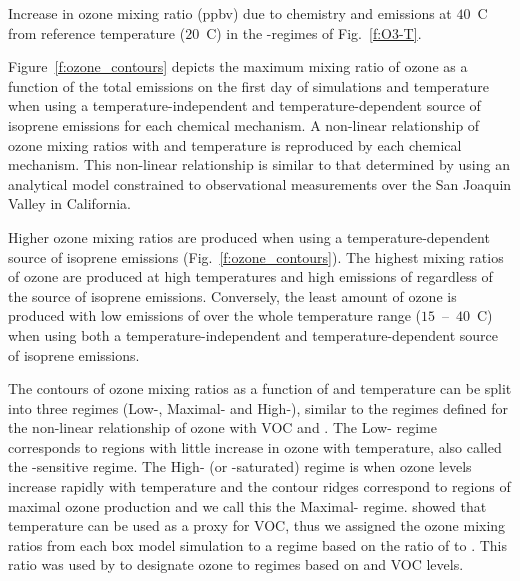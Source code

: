 \begin{table}%
    \centering%
    \caption{Increase in ozone mixing ratio (ppbv) due to chemistry and emissions at $40$~\degree C from reference temperature ($20$~\degree C) in the -regimes of Fig.~\ref{f:O3-T}.}%
    \label{t:differences}%
\end{table}

Figure~\ref{f:ozone_contours} depicts the maximum mixing ratio of ozone as a function of the total  emissions on the first day of simulations and temperature when using a temperature-independent and temperature-dependent source of isoprene emissions for each chemical mechanism.
A non-linear relationship of ozone mixing ratios with  and temperature is reproduced by each chemical mechanism.
This non-linear relationship is similar to that determined by \citet{Pusede:2014} using an analytical model constrained to observational measurements over the San Joaquin Valley in California.

Higher ozone mixing ratios are produced when using a temperature-dependent source of isoprene emissions (Fig.~\ref{f:ozone_contours}).
The highest mixing ratios of ozone are produced at high temperatures and high emissions of  regardless of the source of isoprene emissions.
Conversely, the least amount of ozone is produced with low emissions of  over the whole temperature range ($15$~--~$40$~\degree C) when using both a temperature-independent and temperature-dependent source of isoprene emissions.

The contours of ozone mixing ratios as a function of  and temperature can be split into three  regimes (Low-, Maximal- and High-), similar to the  regimes defined for the non-linear relationship of ozone with VOC and .
The Low- regime corresponds to regions with little increase in ozone with temperature, also called the -sensitive regime.
The High- (or -saturated) regime is when ozone levels increase rapidly with temperature and the contour ridges correspond to regions of maximal ozone production and we call this the Maximal- regime.
\citet{Pusede:2014} showed that temperature can be used as a proxy for VOC, thus we assigned the ozone mixing ratios from each box model simulation to a  regime based on the ratio of  to .
This ratio was used by \citet{Sillman:1995} to designate ozone to  regimes based on  and VOC levels.

